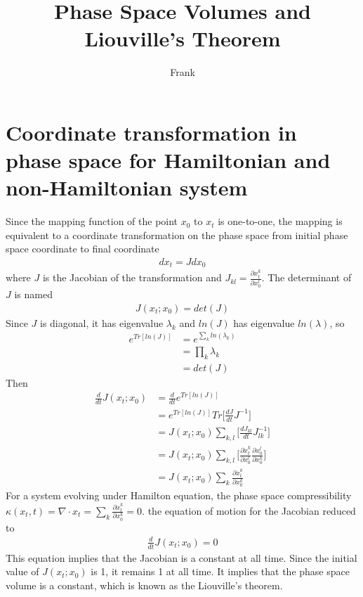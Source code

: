 \documentclass{article}
\title{Phase Space Volumes and Liouville's Theorem }
\author{Frank}
\begin{document}
\maketitle
\section{Coordinate transformation in phase space for Hamiltonian and non-Hamiltonian system}
Since the mapping function of the point $x_0$ to $x_t$ is one-to-one, the mapping is equivalent to a coordinate transformation on the phase space from initial phase space coordinate to final coordinate
\begin{align}
dx_t= Jdx_0
\end{align}
where $J$ is the Jacobian of the transformation and $J_{kl}=\frac{\partial x^k_t}{\partial x^l_0}$. The determinant of $J$ is named
\begin{align}
J(x_t;x_0)=det(J)
\end{align}
Since $J$ is diagonal, it has eigenvalue $\lambda_k$ and $ln(J)$ has eigenvalue $ln(\lambda)$, so
\begin{align}
e^{Tr[ln(J)]}&=e^{\sum_kln(\lambda_k)}\nonumber\\
&=\prod_k\lambda_k\nonumber\\
&=det(J)
\end{align}
Then
\begin{align}
\frac{d}{dt}J(x_t;x_0)&=\frac{d}{dt}e^{Tr[ln(J)]}\nonumber\\
&=e^{Tr[ln(J)]}Tr\bigg[\frac{dJ}{dt}J^{-1}\bigg]\nonumber\\
&=J(x_t;x_0)\sum_{k,l}\bigg[\frac{dJ_{kl}}{dt}J^{-1}_{lk}\bigg]\nonumber\\
&=J(x_t;x_0)\sum_{k,l}\bigg[\frac{\partial\dot{x}^k_t}{\partial x^l_0}\frac{\partial x^l_0}{\partial x^k_0}\bigg]\nonumber\\
&=J(x_t;x_0)\sum_k\frac{\partial\dot{x}^k_t}{\partial x^k_0}
\end{align}
For a system evolving under Hamilton equation, the phase space compressibility $\kappa(x_t,t)=\nabla\cdot x_t=\sum_k\frac{\partial\dot{x}^k_t}{\partial x^k_0}=0$. the equation of motion for the Jacobian reduced to
\begin{align}
\frac{d}{dt}J(x_t;x_0)=0
\end{align}
This equation implies that the Jacobian is a constant at all time. Since the initial value of $J(x_t;x_0)$ is 1, it remains 1 at all time. It implies that the phase space volume is a constant, which is known as the Liouville's theorem.\\
\end{document}
